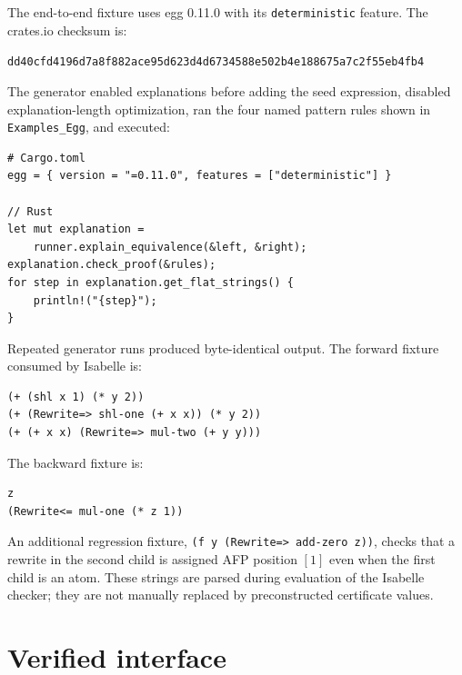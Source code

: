 \documentclass[11pt,a4paper]{article}
\begin{document}
The end-to-end fixture uses egg 0.11.0 with its \texttt{deterministic} feature.
The crates.io checksum is:
\begin{center}
{\scriptsize\texttt{dd40cfd4196d7a8f882ace95d623d4d6734588e502b4e188675a7c2f55eb4fb4}}
\end{center}
The generator enabled explanations before adding the seed expression, disabled
explanation-length optimization, ran the four named pattern rules shown in
\texttt{Examples\_Egg}, and executed:
\begin{verbatim}
# Cargo.toml
egg = { version = "=0.11.0", features = ["deterministic"] }

// Rust
let mut explanation =
    runner.explain_equivalence(&left, &right);
explanation.check_proof(&rules);
for step in explanation.get_flat_strings() {
    println!("{step}");
}
\end{verbatim}
Repeated generator runs produced byte-identical output.  The forward fixture
consumed by Isabelle is:
\begin{verbatim}
(+ (shl x 1) (* y 2))
(+ (Rewrite=> shl-one (+ x x)) (* y 2))
(+ (+ x x) (Rewrite=> mul-two (+ y y)))
\end{verbatim}
The backward fixture is:
\begin{verbatim}
z
(Rewrite<= mul-one (* z 1))
\end{verbatim}
An additional regression fixture,
\texttt{(f y (Rewrite=> add-zero z))}, checks that a rewrite in the second
child is assigned AFP position $[1]$ even when the first child is an atom.
These strings are parsed during evaluation of the Isabelle checker; they are
not manually replaced by preconstructed certificate values.

\section{Verified interface}
\end{document}
